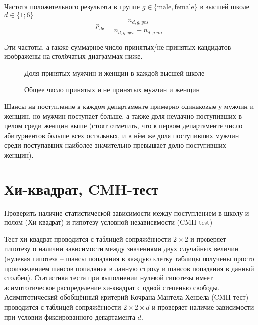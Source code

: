 \documentclass[a4paper,12pt]{article}
\newcommand{\myPictWidth}{.9\textwidth}
\begin{document}
Частота положительного результата в группе $ g \in \{ \text{male}, \text{female} \} $ в высшей школе $ d \in \{1;6 \} $
\[ p_{dg} = \frac{n_{d,g,yes}}{n_{d,g,yes} + n_{d,g,no}} \]

Эти частоты, а также суммарное число принятых/не принятых кандидатов изображены на столбчатых диаграммах ниже.

\begin{figure}[H]
    \label{fig:frequencies}
    \caption{Доля принятых мужчин и женщин в каждой высшей школе}
\end{figure}

\begin{figure}[H]
    \caption{Общее число принятых и не принятых мужчин и женщин}
\end{figure}

Шансы на поступление в каждом департаменте примерно одинаковые у мужчин и женщин, но мужчин поступает больше, а также доля неудачно поступивших в целом среди женщин выше (стоит отметить, что в первом департаменте число абитуриентов больше всех остальных, и в нём же доля поступивших мужчин среди поступавших наиболее значительно превышает долю поступивших женщин).

\section{Хи-квадрат, CMH-тест}

\begin{leftbar}
    Проверить наличие статистической зависимости между поступлением в школу и полом (Хи-квадрат) и гипотезу условной независимости (CMH-test)
\end{leftbar}

Тест хи-квадрат проводится с таблицей сопряжённости $ 2 \times 2 $ и проверяет гипотезу о наличии зависимости между значениями двух случайных величин (нулевая гипотеза -- шансы попадания в каждую клетку таблицы получены просто произведением шансов попадания в данную строку и шансов попадания в данный столбец).
Статистика теста при выполнении нулевой гипотезы имеет асимптотическое распределение хи-квадрат с одной степенью свободы. \\

Асимптотический обобщённый критерий Кочрана-Мантела-Хензела (CMH-тест) проводится с таблицей сопряжённости $ 2 \times 2 \times d $ и проверяет наличие зависимости при условии фиксированного департамента $d$. \\
\end{document}
